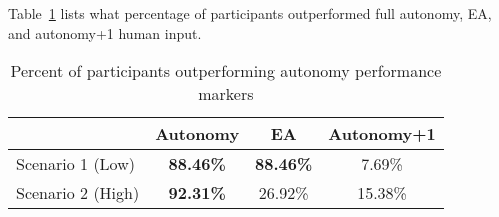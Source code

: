 Table~\ref{ACompareToMarkers} lists what percentage of participants outperformed full autonomy, EA, and autonomy+1 human input.

\begin{table}[hbtp]
\caption{Percent of participants outperforming autonomy performance markers}
	\centering
		\begin{tabular}
			{|l|c|c|c|}
			\hline
			 & Autonomy & EA & Autonomy+1 \\
			\hline
			Scenario 1 (Low) & \textbf{88.46\%} & \textbf{88.46\%} & 7.69\% \\
			\hline
			Scenario 2 (High) & \textbf{92.31\%} & 26.92\% & 15.38\% \\
			\hline			
		\end{tabular}
\label{ACompareToMarkers}
\end{table}
